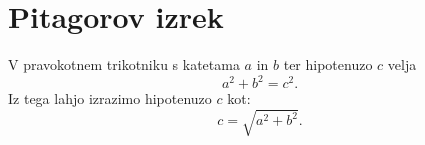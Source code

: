 \documentclass{article}
\begin{document}
\section*{Pitagorov izrek}
V pravokotnem trikotniku s katetama \(a\) in \(b\) ter hipotenuzo \(c\) velja
\[ a^2 + b^2 = c^2.\]
Iz tega lahjo izrazimo hipotenuzo \(c\) kot:
\[c = \sqrt{a^2 + b^2}.\]
\end{document}
